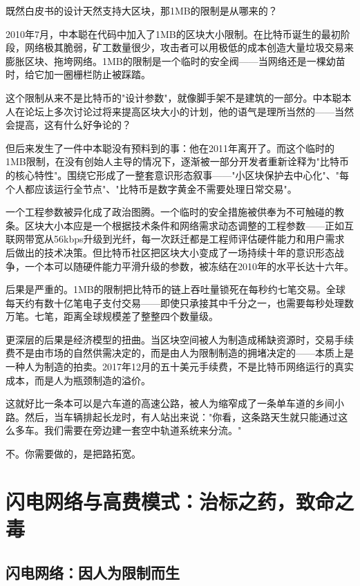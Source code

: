 \documentclass[a4paper,12pt,openany]{ctexbook}
\begin{document}
既然白皮书的设计天然支持大区块，那1MB的限制是从哪来的？

2010年7月，中本聪在代码中加入了1MB的区块大小限制。在比特币诞生的最初阶段，网络极其脆弱，矿工数量很少，攻击者可以用极低的成本创造大量垃圾交易来膨胀区块、拖垮网络。1MB的限制是一个临时的安全阀——当网络还是一棵幼苗时，给它加一圈栅栏防止被踩踏。

这个限制从来不是比特币的"设计参数"，就像脚手架不是建筑的一部分。中本聪本人在论坛上多次讨论过将来提高区块大小的计划，他的语气是理所当然的——当然会提高，这有什么好争论的？

但后来发生了一件中本聪没有预料到的事：他在2011年离开了。而这个临时的1MB限制，在没有创始人主导的情况下，逐渐被一部分开发者重新诠释为"比特币的核心特性"。围绕它形成了一整套意识形态叙事——"小区块保护去中心化"、"每个人都应该运行全节点"、"比特币是数字黄金不需要处理日常交易"。

一个工程参数被异化成了政治图腾。一个临时的安全措施被供奉为不可触碰的教条。区块大小本应是一个根据技术条件和网络需求动态调整的工程参数——正如互联网带宽从56kbps升级到光纤，每一次跃迁都是工程师评估硬件能力和用户需求后做出的技术决策。但比特币社区把区块大小变成了一场持续十年的意识形态战争，一个本可以随硬件能力平滑升级的参数，被冻结在2010年的水平长达十六年。

后果是严重的。1MB的限制把比特币的链上吞吐量锁死在每秒约七笔交易。全球每天约有数十亿笔电子支付交易——即使只承接其中千分之一，也需要每秒处理数万笔。七笔，距离全球规模差了整整四个数量级。

更深层的后果是经济模型的扭曲。当区块空间被人为制造成稀缺资源时，交易手续费不是由市场的自然供需决定的，而是由人为限制制造的拥堵决定的——本质上是一种人为制造的拍卖。2017年12月的五十美元手续费，不是比特币网络运行的真实成本，而是人为瓶颈制造的溢价。

这就好比一条本可以是六车道的高速公路，被人为缩窄成了一条单车道的乡间小路。然后，当车辆排起长龙时，有人站出来说："你看，这条路天生就只能通过这么多车。我们需要在旁边建一套空中轨道系统来分流。"

不。你需要做的，是把路拓宽。


\section*{闪电网络与高费模式：治标之药，致命之毒}



\subsection*{闪电网络：因人为限制而生}
\end{document}
